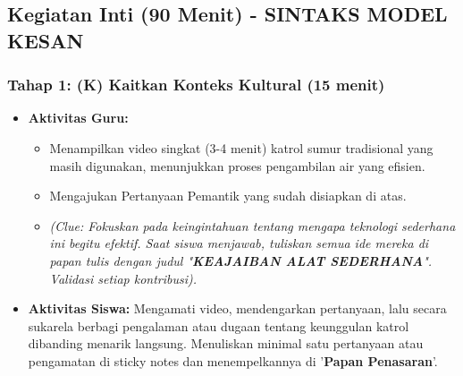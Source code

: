 \documentclass[a4paper,12pt]{article}
\begin{document}
\subsection{Kegiatan Inti (90 Menit) - SINTAKS MODEL KESAN}

\subsubsection{Tahap 1: (K) Kaitkan Konteks Kultural (15 menit)}
\begin{itemize}
\item \textbf{Aktivitas Guru:}
    \begin{itemize}
    \item Menampilkan video singkat (3-4 menit) katrol sumur tradisional yang masih digunakan, menunjukkan proses pengambilan air yang efisien.
    \item Mengajukan Pertanyaan Pemantik yang sudah disiapkan di atas.
    \item \textit{(Clue: Fokuskan pada keingintahuan tentang mengapa teknologi sederhana ini begitu efektif. Saat siswa menjawab, tuliskan semua ide mereka di papan tulis dengan judul "\textbf{KEAJAIBAN ALAT SEDERHANA}". Validasi setiap kontribusi).}
    \end{itemize}
\item \textbf{Aktivitas Siswa:} Mengamati video, mendengarkan pertanyaan, lalu secara sukarela berbagi pengalaman atau dugaan tentang keunggulan katrol dibanding menarik langsung. Menuliskan minimal satu pertanyaan atau pengamatan di sticky notes dan menempelkannya di '\textbf{Papan Penasaran}'.
\end{itemize}
\end{document}

